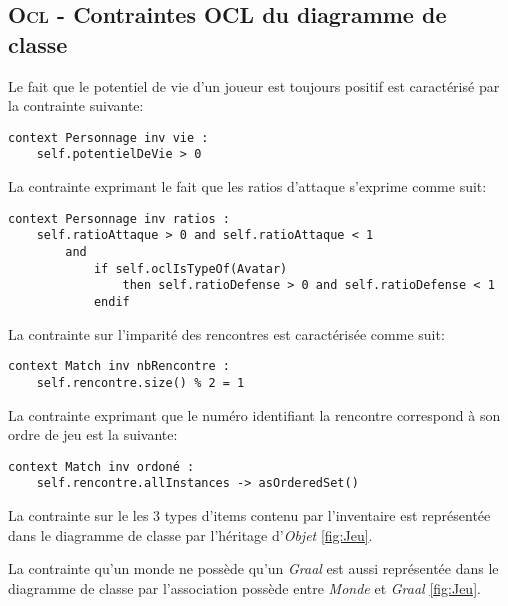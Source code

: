 
\subsection{\textsc{Ocl} - Contraintes OCL du diagramme de classe}
\label{sec:question-4}


Le fait que le potentiel de vie d'un joueur est toujours positif est caractérisé par la contrainte suivante:

\begin{lstlisting}[caption=Contrainte sur lpotentiel de vie,captionpos=b,label={lst:vie},language=OCL]
context Personnage inv vie :
	self.potentielDeVie > 0
\end{lstlisting}

La contrainte exprimant le fait que les ratios d'attaque s'exprime comme suit:

\begin{lstlisting}[caption=Contrainte sur les ratios,captionpos=b,label={lst:ratios},language=OCL]
context Personnage inv ratios :
	self.ratioAttaque > 0 and self.ratioAttaque < 1
		and
			if self.oclIsTypeOf(Avatar)
				then self.ratioDefense > 0 and self.ratioDefense < 1
			endif
\end{lstlisting}

La contrainte sur l'imparité des rencontres est caractérisée comme suit:

\begin{lstlisting}[caption=Contrainte sur l'imparité des rencontres,captionpos=b,label={lst:impair},language=OCL]
context Match inv nbRencontre :
	self.rencontre.size() % 2 = 1
\end{lstlisting}

La contrainte exprimant que le numéro identifiant la rencontre correspond à son ordre de jeu est la suivante:

\begin{lstlisting}[caption=Contrainte sur l'ordre des rencontres,captionpos=b,label={lst:ordreRencontres},language=OCL]
context Match inv ordoné :
	self.rencontre.allInstances -> asOrderedSet()
\end{lstlisting}

La contrainte sur le les 3 types d'items contenu par l'inventaire est représentée dans le diagramme de classe par l'héritage d'\emph{Objet} \ref{fig:Jeu}.

La contrainte qu'un monde ne possède qu'un \emph{Graal} est aussi représentée dans le diagramme de classe par l'association possède entre \emph{Monde} et \emph{Graal} \ref{fig:Jeu}.

